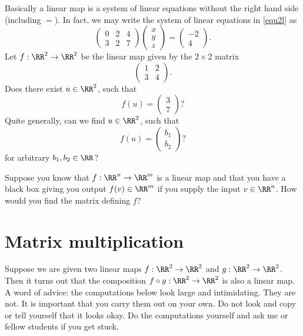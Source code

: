 \documentclass{article}
\begin{document}
Basically a linear map is a system of linear equations without the right hand side (including $=$).
In fact, we may write the system of linear equations in \eqref{equ2l} as
$$
\begin{pmatrix}
0 & 2 & 4\\
3 & 2 & 7
\end{pmatrix}
\begin{pmatrix}
  x \\ y \\ z
\end{pmatrix}
=
\begin{pmatrix}
  -2 \\ 4
\end{pmatrix}.
$$
\beginshex
Let $f: \RR^2\rightarrow \RR^2$ be the linear map given by the $2\times 2$ matrix
$$
\begin{pmatrix}
  1 & 2\\
  3 & 4
\end{pmatrix}.
$$
Does there exist $u\in \RR^2$, such that
$$
f(u) = \begin{pmatrix} 3 \\ 7 \end{pmatrix}?
$$
Quite generally, can we find $u\in \RR^2$, such that
$$
f(u) = \begin{pmatrix} b_1 \\ b_2 \end{pmatrix}?
$$
for arbitrary $b_1, b_2\in \RR$?
\endshex

\beginshex
Suppose you know that $f: \RR^n\rightarrow \RR^m$ is a linear map and
that you have a black box giving you output $f(v)\in \RR^m$ if you
supply the input $v\in \RR^n$. How would you find
the matrix defining $f$?
\endshex


\section{Matrix multiplication}

Suppose we are given two linear maps $f: \RR^2\rightarrow \RR^2$ and
$g:\RR^2\rightarrow \RR^2$. Then it turns out that the composition
$f\circ g: \RR^2\rightarrow \RR^2$ is also a linear map. A word of advice:
the computations below look large and intimidating. They are not. It
is important that you carry them out on your own. Do not look and copy or tell
yourself that it looks okay. Do the computations yourself and ask me
or fellow students if you get stuck.
\end{document}
